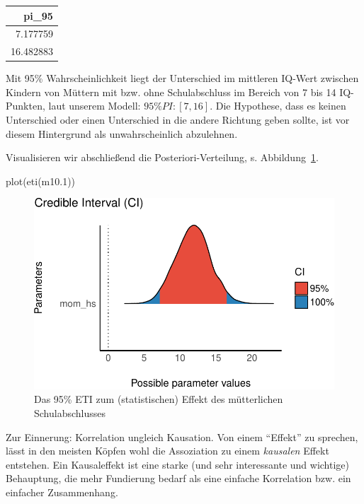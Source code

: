 \documentclass[
  a4paper,
  DIV=11]{scrreprt}
\newenvironment{Shaded}{\begin{snugshade}}{\end{snugshade}}
\newcommand{\FloatTok}[1]{\textcolor[rgb]{0.68,0.00,0.00}{#1}}
\newcommand{\FunctionTok}[1]{\textcolor[rgb]{0.28,0.35,0.67}{#1}}
\newcommand{\NormalTok}[1]{\textcolor[rgb]{0.00,0.23,0.31}{#1}}
\theoremstyle{definition}
\theoremstyle{remark}
\begin{document}
\begin{longtable}[]{@{}r@{}}
\toprule()
pi\_95 \\
\midrule()
\endhead
7.177759 \\
16.482883 \\
\bottomrule()
\end{longtable}

Mit 95\% Wahrscheinlichkeit liegt der Unterschied im mittleren IQ-Wert
zwischen Kindern von Müttern mit bzw. ohne Schulabschluss im Bereich von
7 bis 14 IQ-Punkten, laut unserem Modell: \(95\%PI: [7,16]\). Die
Hypothese, dass es keinen Unterschied oder einen Unterschied in die
andere Richtung geben sollte, ist vor diesem Hintergrund als
unwahrscheinlich abzulehnen.

Visualisieren wir abschließend die Posteriori-Verteilung, s.
Abbildung~\ref{fig-m101hdi}.

\begin{Shaded}
\begin{Highlighting}[]
\FunctionTok{plot}\NormalTok{(}\FunctionTok{eti}\NormalTok{(m10}\FloatTok{.1}\NormalTok{))}
\end{Highlighting}
\end{Shaded}

\begin{figure}[H]

{\centering \includegraphics{./metrische-AV_files/figure-pdf/fig-m101hdi-1.pdf}

}

\caption{\label{fig-m101hdi}Das 95\% ETI zum (statistischen) Effekt des
mütterlichen Schulabschlusses}

\end{figure}

Zur Einnerung: Korrelation ungleich Kausation. Von einem ``Effekt'' zu
sprechen, lässt in den meisten Köpfen wohl die Assoziation zu einem
\emph{kausalen} Effekt entstehen. Ein Kausaleffekt ist eine starke (und
sehr interessante und wichtige) Behauptung, die mehr Fundierung bedarf
als eine einfache Korrelation bzw. ein einfacher Zusammenhang.
\end{document}
